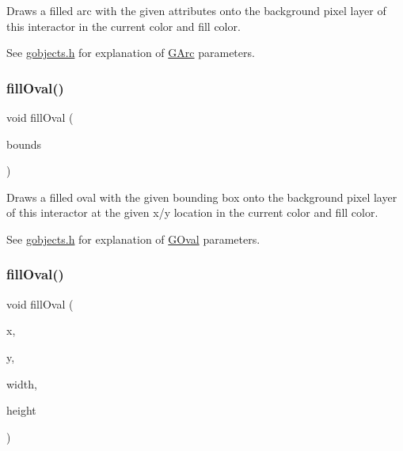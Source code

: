 Draws a filled arc with the given attributes onto the background pixel layer of this interactor in the current color and fill color. 

See \mbox{\hyperlink{gobjects_8h_source}{gobjects.\+h}} for explanation of \mbox{\hyperlink{classGArc}{G\+Arc}} parameters. \mbox{\label{classGDrawingSurface_a1ea6e48d59fb588797dba4deab1397e0}} 
\subsubsection{\texorpdfstring{fill\+Oval()}{fillOval()}\hspace{0.1cm}{\footnotesize\ttfamily [1/2]}}
{\footnotesize\ttfamily void fill\+Oval (\begin{DoxyParamCaption}\item[{const \mbox{\hyperlink{classGRectangle}{G\+Rectangle}} \&}]{bounds }\end{DoxyParamCaption})\hspace{0.3cm}{\ttfamily [virtual]}}



Draws a filled oval with the given bounding box onto the background pixel layer of this interactor at the given x/y location in the current color and fill color. 

See \mbox{\hyperlink{gobjects_8h_source}{gobjects.\+h}} for explanation of \mbox{\hyperlink{classGOval}{G\+Oval}} parameters. \mbox{\label{classGDrawingSurface_a28c700c82f31cd328a4629273420ee61}} 
\subsubsection{\texorpdfstring{fill\+Oval()}{fillOval()}\hspace{0.1cm}{\footnotesize\ttfamily [2/2]}}
{\footnotesize\ttfamily void fill\+Oval (\begin{DoxyParamCaption}\item[{double}]{x,  }\item[{double}]{y,  }\item[{double}]{width,  }\item[{double}]{height }\end{DoxyParamCaption})\hspace{0.3cm}{\ttfamily [virtual]}}




